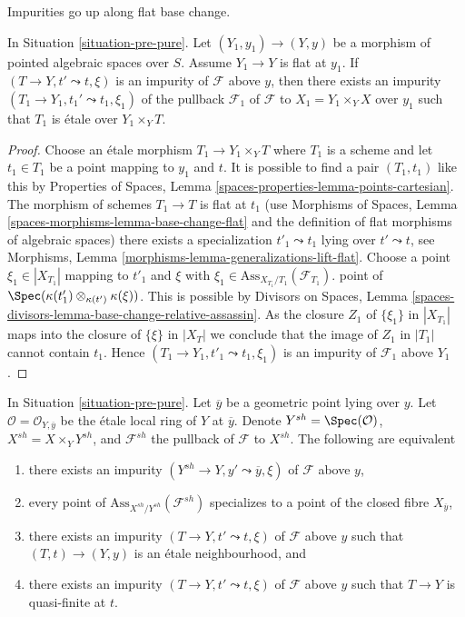 \noindent
Impurities go up along flat base change.

\begin{lemma}
\label{lemma-flat-ascent-impurity}
In Situation \ref{situation-pre-pure}.
Let $(Y_1, y_1) \to (Y, y)$ be a morphism of pointed
algebraic spaces over $S$. Assume $Y_1 \to Y$ is flat at $y_1$.
If $(T \to Y, t' \leadsto t, \xi)$ is an impurity of
$\mathcal{F}$ above $y$, then there exists an impurity
$(T_1 \to Y_1, t_1' \leadsto t_1, \xi_1)$ of the pullback
$\mathcal{F}_1$ of $\mathcal{F}$ to $X_1 = Y_1 \times_Y X$
over $y_1$ such that $T_1$ is \'etale over $Y_1 \times_Y T$.
\end{lemma}

\begin{proof}
Choose an \'etale morphism $T_1 \to Y_1 \times_Y T$ where $T_1$
is a scheme and let $t_1 \in T_1$ be a point mapping to $y_1$ and $t$.
It is possible to find a pair $(T_1, t_1)$ like this by
Properties of Spaces, Lemma \ref{spaces-properties-lemma-points-cartesian}.
The morphism of schemes $T_1 \to T$ is flat at $t_1$
(use Morphisms of Spaces, Lemma \ref{spaces-morphisms-lemma-base-change-flat}
and the definition of flat morphisms of algebraic spaces)
there exists a specialization $t'_1 \leadsto t_1$ lying over
$t' \leadsto t$, see
Morphisms, Lemma \ref{morphisms-lemma-generalizations-lift-flat}.
Choose a point $\xi_1 \in |X_{T_1}|$ mapping to $t'_1$
and $\xi$ with $\xi_1 \in \text{Ass}_{X_{T_1}/T_1}(\mathcal{F}_{T_1})$.
point of $\Spec(\kappa(t'_1) \otimes_{\kappa(t')} \kappa(\xi))$.
This is possible by
Divisors on Spaces, Lemma
\ref{spaces-divisors-lemma-base-change-relative-assassin}.
As the closure $Z_1$ of $\{\xi_1\}$ in $|X_{T_1}|$ maps into the
closure of $\{\xi\}$ in $|X_T|$ we conclude that
the image of $Z_1$ in $|T_1|$ cannot contain $t_1$.
Hence $(T_1 \to Y_1, t'_1 \leadsto t_1, \xi_1)$
is an impurity of $\mathcal{F}_1$ above $Y_1$.
\end{proof}

\begin{lemma}
\label{lemma-pure-along-X-y}
In Situation \ref{situation-pre-pure}. Let $\overline{y}$ be a geometric
point lying over $y$. Let $\mathcal{O} = \mathcal{O}_{Y, \overline{y}}$
be the \'etale local ring of $Y$ at $\overline{y}$. Denote
$Y^{sh} = \Spec(\mathcal{O})$, $X^{sh} = X \times_Y Y^{sh}$, and
$\mathcal{F}^{sh}$ the pullback of $\mathcal{F}$ to $X^{sh}$.
The following are equivalent
\begin{enumerate}
\item there exists an impurity
$(Y^{sh} \to Y, y' \leadsto \overline{y}, \xi)$
of $\mathcal{F}$ above $y$,
\item every point of $\text{Ass}_{X^{sh}/Y^{sh}}(\mathcal{F}^{sh})$
specializes to a point of the closed fibre $X_{\overline{y}}$,
\item there exists an impurity $(T \to Y, t' \leadsto t, \xi)$
of $\mathcal{F}$ above $y$ such that $(T, t) \to (Y, y)$ is an
\'etale neighbourhood, and
\item there exists an impurity $(T \to Y, t' \leadsto t, \xi)$
of $\mathcal{F}$ above $y$ such that $T \to Y$ is quasi-finite at $t$.
\end{enumerate}
\end{lemma}

